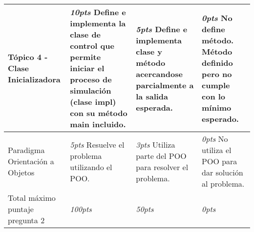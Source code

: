 \documentclass{article}
\begin{document}
\begin{table}[!ht]
{\begin{center}
\begin{tabular}{|p{4cm}|p{4cm}|p{4cm}|p{4cm}|}
              T\'opico 4 - Clase Inicializadora &
							\emph{10pts} Define e implementa la clase de control que permite iniciar el proceso de simulaci\'on (clase impl) con su m\'etodo main incluido.&
							\emph{5pts} Define e implementa clase y m\'etodo acercandose parcialmente a la salida esperada.  &
							\emph{ 0pts} No define m\'etodo.  M\'etodo definido pero no cumple con lo m\'inimo esperado. \\ \hline

							Paradigma Orientaci\'on a Objetos  &
							\emph{5pts} Resuelve el problema utilizando el POO. &
							\emph{3pts} Utiliza parte del POO para resolver el problema. &
							\emph{0pts} No utiliza el POO para dar soluci\'on al problema.\\ \hline
							Total m\'aximo puntaje pregunta 2 &
							\emph{100pts} &
							\emph{50pts} &
							\emph{  0pts} \\ \hline
					\end{tabular}
			\end{center}}
	 \end{table}
\end{document}
